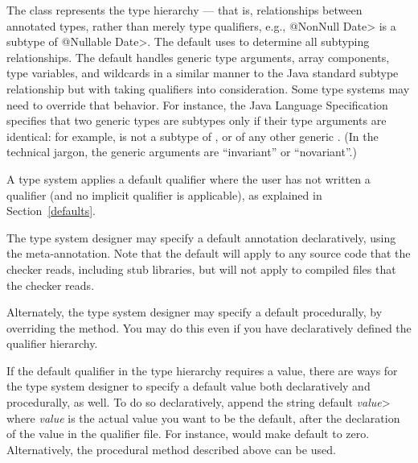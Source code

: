 The  class represents the type hierarchy ---
that is, relationships between
annotated types, rather than merely type qualifiers, e.g., \<@NonNull
Date> is a subtype of \<@Nullable Date>.  The default  uses
 to determine all subtyping relationships.
The default  handles
generic type arguments, array components, type variables, and
wildcards in a similar manner to the Java standard subtype
relationship but with taking qualifiers into consideration.  Some type
systems may need to override that behavior.  For instance, the Java
Language Specification specifies that two generic types are subtypes only
if their type arguments are identical:  for example,
 is not a subtype of , or of any other
generic .
(In the technical jargon, the generic arguments are ``invariant'' or ``novariant''.)



A type system applies a default qualifier where the user has not written a
qualifier (and no implicit qualifier is applicable), as explained in
Section~\ref{defaults}.

The type system designer may specify a default annotation declaratively,
using the 
meta-annotation.
Note that the default will apply to any source code that the checker reads,
including stub libraries, but will not apply to compiled 
files that the checker reads.

\begin{sloppypar}
Alternately, the type system designer may specify a default procedurally,
by overriding the
method.  You may do this even if you have declaratively defined the
qualifier hierarchy.
\end{sloppypar}

If the default qualifier in the type hierarchy requires a value, there are
ways for the type system designer to specify a default value both
declaratively and procedurally, as well.  To do so declaratively, append
the string \<default \emph{value}> where \emph{value} is the actual value
you want to be the default, after the declaration of the value in the
qualifier file.  For instance,  would make
 default to zero. Alternatively, the procedural method
described above can be used.

